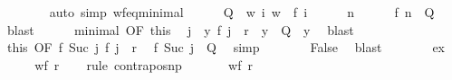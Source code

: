 \begin{isabellebody}
\ \ \ \ \ \ \isamarkupfalse%
\ {\isacharparenleft}{\kern0pt}auto\ simp{\isacharcolon}{\kern0pt}\ wf{\isacharunderscore}{\kern0pt}eq{\isacharunderscore}{\kern0pt}minimal{\isacharparenright}{\kern0pt}\isanewline
\ \ \ \ \isamarkupfalse%
\ {\isacharquery}{\kern0pt}Q\ {\isacharequal}{\kern0pt}\ {\isachardoublequoteopen}{\isacharbraceleft}{\kern0pt}w{\isachardot}{\kern0pt}\ {\isasymexists}i{\isachardot}{\kern0pt}\ w\ {\isacharequal}{\kern0pt}\ f\ i{\isacharbraceright}{\kern0pt}{\isachardoublequoteclose}\isanewline
\ \ \ \ \isamarkupfalse%
\ n\isanewline
\ \ \ \ \isamarkupfalse%
\ {\isachardoublequoteopen}f\ n\ {\isasymin}\ {\isacharquery}{\kern0pt}Q{\isachardoublequoteclose}\ \isamarkupfalse%
\ blast\isanewline
\ \ \ \ \isamarkupfalse%
\ minimal\ {\isacharbrackleft}{\kern0pt}OF\ this{\isacharbrackright}{\kern0pt}\ \isamarkupfalse%
\ j\ \ {\isachardoublequoteopen}{\isacharparenleft}{\kern0pt}y{\isacharcomma}{\kern0pt}\ f\ j{\isacharparenright}{\kern0pt}\ {\isasymin}\ r\ {\isasymLongrightarrow}\ y\ {\isasymnotin}\ {\isacharquery}{\kern0pt}Q{\isachardoublequoteclose}\ \ y\ \isamarkupfalse%
\ blast\isanewline
\ \ \ \ \isamarkupfalse%
\ this\ {\isacharbrackleft}{\kern0pt}OF\ {\isacartoucheopen}{\isacharparenleft}{\kern0pt}f\ {\isacharparenleft}{\kern0pt}Suc\ j{\isacharparenright}{\kern0pt}{\isacharcomma}{\kern0pt}\ f\ j{\isacharparenright}{\kern0pt}\ {\isasymin}\ r{\isacartoucheclose}{\isacharbrackright}{\kern0pt}\ \isamarkupfalse%
\ {\isachardoublequoteopen}f\ {\isacharparenleft}{\kern0pt}Suc\ j{\isacharparenright}{\kern0pt}\ {\isasymnotin}\ {\isacharquery}{\kern0pt}Q{\isachardoublequoteclose}\ \isamarkupfalse%
\ simp\isanewline
\ \ \ \ \isamarkupfalse%
\ \isamarkupfalse%
\ False\ \isamarkupfalse%
\ blast\isanewline
\ \ \isamarkupfalse%
\isanewline
{}\isamarkupfalse%
\isanewline
\ \ \isamarkupfalse%
\ {\isachardoublequoteopen}{\isasymnot}\ {\isacharquery}{\kern0pt}ex{\isachardoublequoteclose}\isanewline
\ \ \isamarkupfalse%
\ \isamarkupfalse%
\ {\isachardoublequoteopen}wf\ r{\isachardoublequoteclose}\isanewline
\ \ \isamarkupfalse%
\ {\isacharparenleft}{\kern0pt}rule\ contrapos{\isacharunderscore}{\kern0pt}np{\isacharparenright}{\kern0pt}\isanewline
\ \ \ \ \isamarkupfalse%
\ {\isachardoublequoteopen}{\isasymnot}\ wf\ r{\isachardoublequoteclose}\isanewline

\end{isabellebody}
